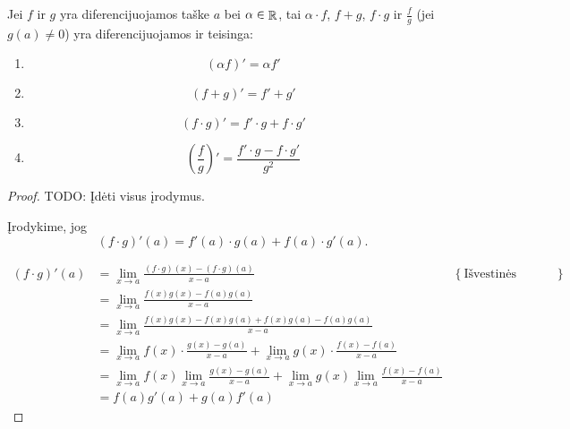 \begin{prop}
  Jei $f$ ir $g$ yra diferencijuojamos taške $a$ bei 
  $\alpha \in \mathop{\mathbb{R}}$, tai $\alpha \cdot f$, $f + g$, $f \cdot g$ ir
  $\frac{f}{g}$ (jei $g(a) \neq 0$) yra diferencijuojamos ir teisinga:
  \begin{enumerate}
    \item 
      \begin{equation*}
        (\alpha f)' = \alpha f'
      \end{equation*}
    \item 
      \begin{equation*}
        (f + g)' = f' + g'
      \end{equation*}
    \item
      \begin{equation*}
        (f \cdot g)' = f' \cdot g + f \cdot g'
      \end{equation*}
    \item
      \begin{equation*}
        \left( \frac{f}{g} \right)' = \frac{f' \cdot g - f \cdot g'}{g^2}
      \end{equation*}
  \end{enumerate}

  \begin{proof}
    TODO: Įdėti visus įrodymus.
    
    Įrodykime, jog 
    \begin{equation*}
      (f \cdot g)'(a) = f'(a) \cdot g(a) + f(a) \cdot g'(a).
    \end{equation*}

    \begin{align*}
      (f \cdot g)'(a) 
      &= \lim_{x \to a} \frac{(f \cdot g)(x) - (f \cdot g)(a)}{x - a} 
        & \left\{ \text{Išvestinės apibrėžimas.} \right\} \\
      &= \lim_{x \to a} \frac{f(x)g(x) - f(a)g(a)}{x - a} \\
      &= \lim_{x \to a} 
        \frac{f(x)g(x) - f(x)g(a) + f(x)g(a) - f(a)g(a)}{x - a} \\
      &= \lim_{x \to a} f(x) \cdot \frac{g(x) - g(a)}{x - a} + 
        \lim_{x \to a} g(x) \cdot \frac{f(x) - f(a)}{x - a} \\
      &= \lim_{x \to a} f(x) \lim_{x \to a} \frac{g(x) - g(a)}{x - a} +
        \lim_{x \to a} g(x) \lim_{x \to a} \frac{f(x) - f(a)}{x - a} \\
      &= f(a)g'(a) + g(a)f'(a)
    \end{align*}
  \end{proof}
\end{prop}

